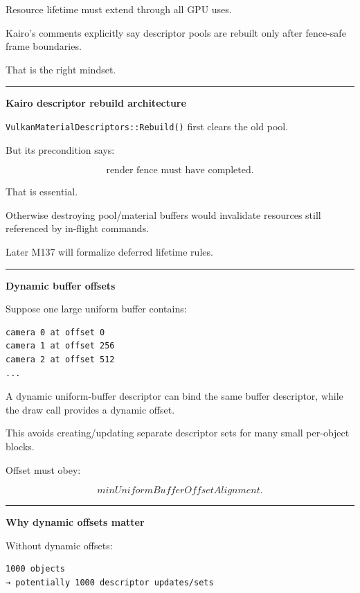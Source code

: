 Resource lifetime must extend through all GPU uses.

Kairo's comments explicitly say descriptor pools are rebuilt only after fence-safe frame boundaries.

That is the right mindset.

\begin{center}\rule{0.5\linewidth}{0.5pt}\end{center}

\textbf{Kairo descriptor rebuild architecture}

\texttt{VulkanMaterialDescriptors::Rebuild()} first clears the old pool.

But its precondition says:

\[
\boxed{
\text{render fence must have completed}.
}
\]

That is essential.

Otherwise destroying pool/material buffers would invalidate resources still referenced by in-flight commands.

Later M137 will formalize deferred lifetime rules.

\begin{center}\rule{0.5\linewidth}{0.5pt}\end{center}

\textbf{Dynamic buffer offsets}

Suppose one large uniform buffer contains:

\protect{}\label{p11-dyn-ubo}%
\begin{verbatim}
camera 0 at offset 0
camera 1 at offset 256
camera 2 at offset 512
...
\end{verbatim}

A dynamic uniform-buffer descriptor can bind the same buffer descriptor, while the draw call provides a dynamic offset.

This avoids creating/updating separate descriptor sets for many small per-object blocks.

Offset must obey:

\[
minUniformBufferOffsetAlignment.
\]

\begin{center}\rule{0.5\linewidth}{0.5pt}\end{center}

\textbf{Why dynamic offsets matter}

Without dynamic offsets:

\begin{verbatim}
1000 objects
→ potentially 1000 descriptor updates/sets
\end{verbatim}

